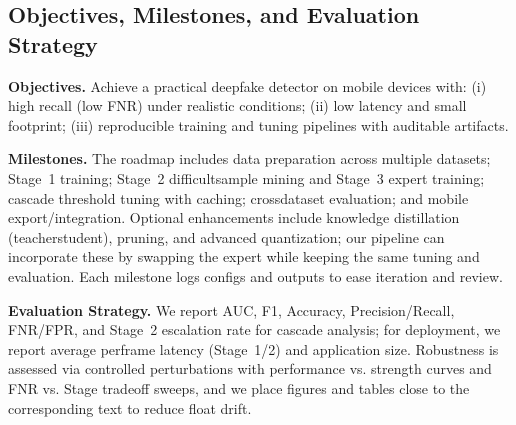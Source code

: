 \subsection*{Objectives, Milestones, and Evaluation Strategy}
\textbf{Objectives.} Achieve a practical deepfake detector on mobile devices with: (i) high recall (low FNR) under realistic conditions; (ii) low latency and small footprint; (iii) reproducible training and tuning pipelines with auditable artifacts.

\textbf{Milestones.} The roadmap includes data preparation across multiple datasets; Stage~1 training; Stage~2 difficult\-sample mining and Stage~3 expert training; cascade threshold tuning with caching; cross\-dataset evaluation; and mobile export/integration. Optional enhancements include knowledge distillation (teacher\-\-student), pruning, and advanced quantization; our pipeline can incorporate these by swapping the expert while keeping the same tuning and evaluation. Each milestone logs configs and outputs to ease iteration and review.

\textbf{Evaluation Strategy.} We report AUC, F1, Accuracy, Precision/Recall, FNR/FPR, and Stage~2 escalation rate for cascade analysis; for deployment, we report average per\-frame latency (Stage~1/2) and application size. Robustness is assessed via controlled perturbations with performance vs. strength curves and FNR vs. Stage trade\-off sweeps, and we place figures and tables close to the corresponding text to reduce float drift.
